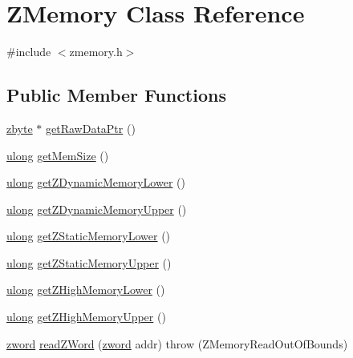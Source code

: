 \hypertarget{class_z_memory}{\section{Z\-Memory Class Reference}
\label{class_z_memory}
}


{\ttfamily \#include $<$zmemory.\-h$>$}

\subsection*{Public Member Functions}
\begin{DoxyCompactItemize}
\item 
\hyperlink{zglobal_8h_aab4ef09707609e67bcc5a552cde255d2}{zbyte} $\ast$ \hyperlink{class_z_memory_a701e72664f8f28c5b7359e767458b147}{get\-Raw\-Data\-Ptr} ()
\item 
\hyperlink{zglobal_8h_a718b4eb2652c286f4d42dc18a8e71a1a}{ulong} \hyperlink{class_z_memory_a855d50c042e28fde0b54ad003be317c9}{get\-Mem\-Size} ()
\item 
\hyperlink{zglobal_8h_a718b4eb2652c286f4d42dc18a8e71a1a}{ulong} \hyperlink{class_z_memory_af91d5e9664afa35b54694c6dfe8f6700}{get\-Z\-Dynamic\-Memory\-Lower} ()
\item 
\hyperlink{zglobal_8h_a718b4eb2652c286f4d42dc18a8e71a1a}{ulong} \hyperlink{class_z_memory_ae2790a344ca08584a6fb2f3a3d19bbc3}{get\-Z\-Dynamic\-Memory\-Upper} ()
\item 
\hyperlink{zglobal_8h_a718b4eb2652c286f4d42dc18a8e71a1a}{ulong} \hyperlink{class_z_memory_a177dc4a6dc2390a18a51e91ffccdf5d3}{get\-Z\-Static\-Memory\-Lower} ()
\item 
\hyperlink{zglobal_8h_a718b4eb2652c286f4d42dc18a8e71a1a}{ulong} \hyperlink{class_z_memory_a9c0e44da941991913cc18adc50029d91}{get\-Z\-Static\-Memory\-Upper} ()
\item 
\hyperlink{zglobal_8h_a718b4eb2652c286f4d42dc18a8e71a1a}{ulong} \hyperlink{class_z_memory_a43f47592c50fb8521e21805796a25be9}{get\-Z\-High\-Memory\-Lower} ()
\item 
\hyperlink{zglobal_8h_a718b4eb2652c286f4d42dc18a8e71a1a}{ulong} \hyperlink{class_z_memory_a579f76a2b85fad4e7e96a0bf77ef7f94}{get\-Z\-High\-Memory\-Upper} ()
\item 
\hyperlink{zglobal_8h_a6507dc55d18847442d5fb20b6c73fe73}{zword} \hyperlink{class_z_memory_a894c694789b32d085e7e33e486419e94}{read\-Z\-Word} (\hyperlink{zglobal_8h_a6507dc55d18847442d5fb20b6c73fe73}{zword} addr)  throw (\-Z\-Memory\-Read\-Out\-Of\-Bounds)
\item 

\end{DoxyCompactItemize}
